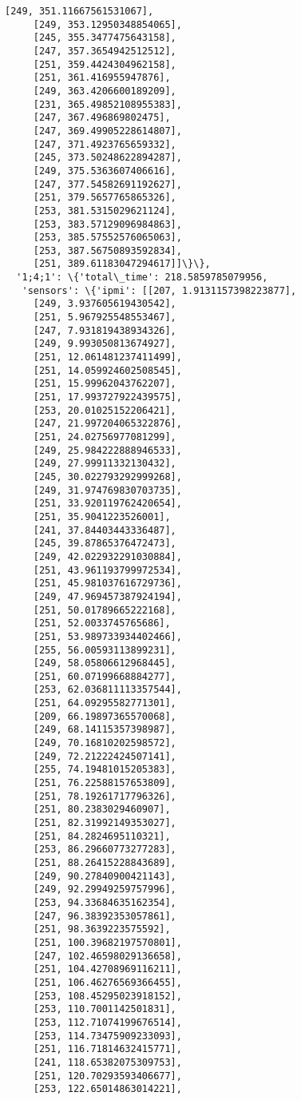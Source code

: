 \documentclass[11pt]{article}
\begin{document}
\begin{tcolorbox}[breakable, size=fbox, boxrule=.5pt, pad at break*=1mm, opacityfill=0]
\begin{Verbatim}[commandchars=\\\{\}]
     [249, 351.11667561531067],
     [249, 353.12950348854065],
     [245, 355.3477475643158],
     [247, 357.3654942512512],
     [251, 359.4424304962158],
     [251, 361.416955947876],
     [249, 363.4206600189209],
     [231, 365.49852108955383],
     [247, 367.496869802475],
     [247, 369.49905228614807],
     [247, 371.4923765659332],
     [245, 373.50248622894287],
     [249, 375.5363607406616],
     [247, 377.54582691192627],
     [251, 379.5657765865326],
     [253, 381.5315029621124],
     [253, 383.57129096984863],
     [253, 385.57552576065063],
     [253, 387.56750893592834],
     [251, 389.61183047294617]]\}\},
  '1;4;1': \{'total\_time': 218.5859785079956,
   'sensors': \{'ipmi': [[207, 1.9131157398223877],
     [249, 3.937605619430542],
     [251, 5.967925548553467],
     [247, 7.931819438934326],
     [249, 9.993050813674927],
     [251, 12.061481237411499],
     [251, 14.059924602508545],
     [251, 15.99962043762207],
     [251, 17.993727922439575],
     [253, 20.01025152206421],
     [247, 21.997204065322876],
     [251, 24.02756977081299],
     [249, 25.984222888946533],
     [249, 27.99911332130432],
     [245, 30.022793292999268],
     [249, 31.974769830703735],
     [251, 33.920119762420654],
     [251, 35.9041223526001],
     [241, 37.84403443336487],
     [245, 39.87865376472473],
     [249, 42.022932291030884],
     [251, 43.961193799972534],
     [251, 45.981037616729736],
     [249, 47.969457387924194],
     [251, 50.01789665222168],
     [251, 52.0033745765686],
     [251, 53.989733934402466],
     [255, 56.00593113899231],
     [249, 58.05806612968445],
     [251, 60.07199668884277],
     [253, 62.036811113357544],
     [251, 64.09295582771301],
     [209, 66.19897365570068],
     [249, 68.14115357398987],
     [249, 70.16810202598572],
     [249, 72.21222424507141],
     [255, 74.19481015205383],
     [251, 76.22588157653809],
     [251, 78.19261717796326],
     [251, 80.2383029460907],
     [251, 82.31992149353027],
     [251, 84.2824695110321],
     [253, 86.29660773277283],
     [251, 88.26415228843689],
     [249, 90.27840900421143],
     [249, 92.29949259757996],
     [253, 94.33684635162354],
     [247, 96.38392353057861],
     [251, 98.3639223575592],
     [251, 100.39682197570801],
     [247, 102.46598029136658],
     [251, 104.42708969116211],
     [251, 106.46276569366455],
     [253, 108.45295023918152],
     [253, 110.7001142501831],
     [253, 112.71074199676514],
     [253, 114.73475909233093],
     [251, 116.71814632415771],
     [241, 118.65382075309753],
     [251, 120.70293593406677],
     [253, 122.65014863014221],

\end{Verbatim}
\end{tcolorbox}
\end{document}
